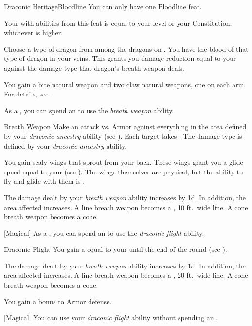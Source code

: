     \begin{feat}{Draconic Heritage}{Bloodline}
         You can only have one Bloodline feat.

         Your  with abilities from this feat is equal to your level or your Constitution, whichever is higher.

         Choose a type of dragon from among the dragons on .
        You have the blood of that type of dragon in your veins.
        This grants you damage reduction equal to your  against the damage type that dragon's breath weapon deals.

         You gain a bite natural weapon and two claw natural weapons, one on each arm.
        For details, see .

         As a , you can spend an  to use the \textit{breath weapon} ability.
        \begin{ability}{Breath Weapon}
            Make an attack vs. Armor against everything in the area defined by your \textit{draconic ancestry} ability (see ).
            \hit Each target takes .
            The damage type is defined by your \textit{draconic ancestry} ability.
        \end{ability}

         You gain scaly wings that sprout from your back.
        These wings grant you a glide speed equal to your  (see ).
        The wings themselves are physical, but the ability to fly and glide with them is .

         The damage dealt by your \textit{breath weapon} ability increases by \plus1d.
        In addition, the area affected increases.
        A line breath weapon becomes a \areahuge, 10 ft.\ wide line.
        A cone breath weapon becomes a \arealarge cone.

        [Magical] As a , you can spend an  to use the \textit{draconic flight} ability.
        \begin{ability}{Draconic Flight}
            You gain a  equal to your  until the end of the round (see ).
        \end{ability}

         The damage dealt by your \textit{breath weapon} ability increases by \plus1d.
        In addition, the area affected increases.
        A line breath weapon becomes a \areahuge, 20 ft.\ wide line.
        A cone breath weapon becomes a \areahuge cone.

         You gain a  bonus to Armor defense. 

        [Magical] You can use your \textit{draconic flight} ability without spending an .
    \end{feat}

